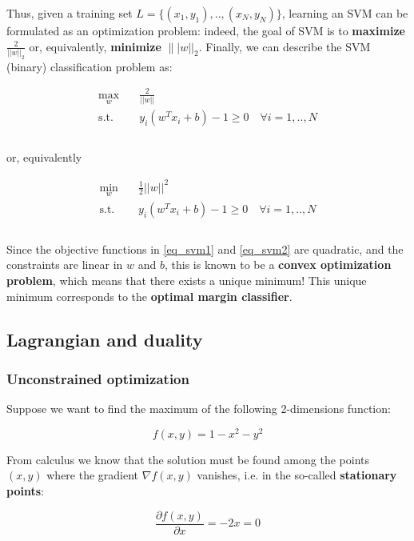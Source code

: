Thus, given a training set $L = \{ (x_1, y_1), .., (x_N, y_N) \}$, learning an SVM can be formulated as an optimization problem: indeed, the goal of SVM is to \textbf{maximize} $\frac{2}{||w||_2}$ or, equivalently, \textbf{minimize} $\||w||_2$. Finally, we can describe the SVM (binary) classification problem as:

\begin{equation}\label{eq_svm1}
\begin{aligned}
\max_{w} \quad & \frac{2}{||w||}\\
\textrm{s.t.} \quad & y_{i}(w^Tx_{i}+b) - 1 \geq 0 \quad \forall i = 1,..,N\\ \\
\end{aligned}
\end{equation}

or, equivalently

\begin{equation}\label{eq_svm2}
\begin{aligned}
\min_{w} \quad & \frac{1}{2} ||w||^2\\
\textrm{s.t.} \quad & y_{i}(w^Tx_{i}+b) - 1 \geq 0 \quad \forall i = 1,..,N\\ \\
\end{aligned}
\end{equation}

Since the objective functions in \ref{eq_svm1} and \ref{eq_svm2} are quadratic, and the constraints are linear in $w$ and $b$, this is known to be a \textbf{convex optimization problem}, which means that there exists a unique minimum! This unique minimum corresponds to the \textbf{optimal margin classifier}. 

\subsection{Lagrangian and duality}
\subsubsection{Unconstrained optimization}
Suppose we want to find the maximum of the following 2-dimensions function:

$$
f(x,y) = 1 - x^2 - y^2
$$

From calculus we know that the solution must be found among the points $(x,y)$ where the gradient $\nabla f(x,y)$ vanishes, i.e. in the so-called \textbf{stationary points}:

$$
\frac{\partial f(x,y)}{\partial x} = -2x = 0
$$


